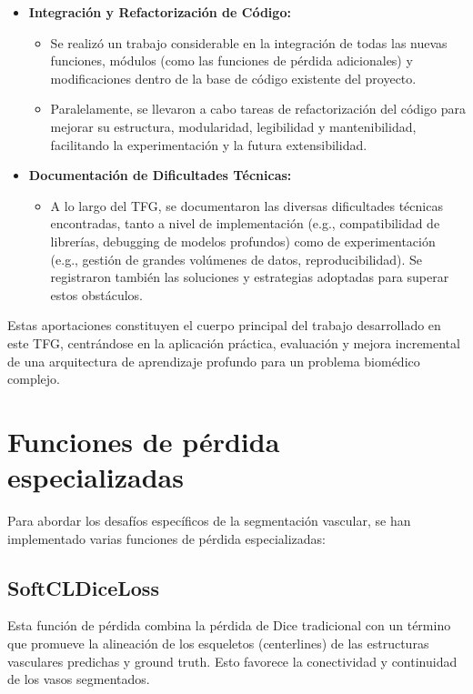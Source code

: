 \documentclass[11pt,a4paper]{report} %
\begin{document}
\begin{itemize}
\begin{itemize}
        \end{itemize}
    \item \textbf{Integración y Refactorización de Código:}
        \begin{itemize}
            \item Se realizó un trabajo considerable en la integración de todas las nuevas funciones, módulos (como las funciones de pérdida adicionales) y modificaciones dentro de la base de código existente del proyecto.
            \item Paralelamente, se llevaron a cabo tareas de refactorización del código para mejorar su estructura, modularidad, legibilidad y mantenibilidad, facilitando la experimentación y la futura extensibilidad.
        \end{itemize}
    \item \textbf{Documentación de Dificultades Técnicas:}
        \begin{itemize}
            \item A lo largo del TFG, se documentaron las diversas dificultades técnicas encontradas, tanto a nivel de implementación (e.g., compatibilidad de librerías, debugging de modelos profundos) como de experimentación (e.g., gestión de grandes volúmenes de datos, reproducibilidad). Se registraron también las soluciones y estrategias adoptadas para superar estos obstáculos.
        \end{itemize}
\end{itemize}
Estas aportaciones constituyen el cuerpo principal del trabajo desarrollado en este TFG, centrándose en la aplicación práctica, evaluación y mejora incremental de una arquitectura de aprendizaje profundo para un problema biomédico complejo.

\section{Funciones de pérdida especializadas}
Para abordar los desafíos específicos de la segmentación vascular, se han implementado varias funciones de pérdida especializadas:

\subsection{SoftCLDiceLoss}
Esta función de pérdida combina la pérdida de Dice tradicional con un término que promueve la alineación de los esqueletos (centerlines) de las estructuras vasculares predichas y ground truth. Esto favorece la conectividad y continuidad de los vasos segmentados.
\end{document}
